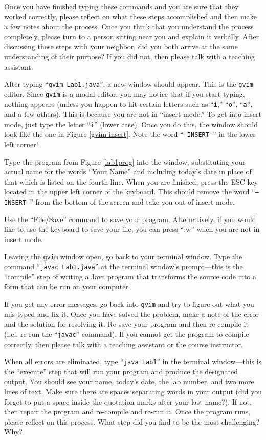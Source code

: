 \documentclass[11pt]{article}
\begin{document}
Once you have finished typing these commands and you are sure that they worked correctly, please reflect on what these
steps accomplished and then make a few notes about the process. Once you think that you understand the process
completely, please turn to a person sitting near you and explain it verbally. After discussing these steps with your
neighbor, did you both arrive at the same understanding of their purpose? If you did not, then please talk with a
teaching assistant.

After typing ``{\tt gvim Lab1.java}'', a new window should appear. This is the {\tt gvim} editor.  Since {\tt gvim} is a
modal editor, you may notice that if you start typing, nothing appears (unless you happen to hit certain letters such as
``{\tt i},'' ``{\tt o}'', ``{\tt a}'', and a few others). This is because you are not in ``insert mode.'' To get into
insert mode, just type the letter ``{\tt i}'' (lower case). Once you do this, the window should look like the one in
Figure \ref{gvim-insert}. Note the word ``{\tt --INSERT--}'' in the lower left corner!

Type the program from Figure \ref{lab1prog} into the window, substituting your actual name for the words ``Your Name''
and including today's date in place of that which is listed on the fourth line. When you are finished, press the ESC
key located in the upper left corner of the keyboard. This should remove the word ``{\tt --INSERT--}'' from the bottom
of the screen and take you out of insert mode.

Use the ``File/Save'' command to save your program. Alternatively, if you would like to use the keyboard to save your
file, you can press ``:w'' when you are not in insert mode.

Leaving the {\tt gvim} window open, go back to your terminal window. Type the command ``{\tt javac Lab1.java}'' at the
terminal window's prompt---this is the ``compile'' step of writing a Java program that transforms the source code into a
form that can be run on your computer.

If you get any error messages, go back into {\tt gvim} and try to figure out what you mis-typed and fix it. Once you
have solved the problem, make a note of the error and the solution for resolving it. Re-save your program and then
re-compile it (i.e., re-run the ``{\tt javac}'' command). If you cannot get the program to compile correctly, then
please talk with a teaching assistant or the course instructor.

When all errors are eliminated, type ``{\tt java Lab1}'' in the terminal window---this is the ``execute'' step that will
run your program and produce the designated output.  You should see your name, today's date, the lab number, and two
more lines of text. Make sure there are spaces separating words in your output (did you forget to put a space inside the
quotation marks after your last name?). If not, then repair the program and re-compile and re-run it.  Once the program
runs, please reflect on this process.  What step did you find to be the most challenging? Why?
\end{document}
